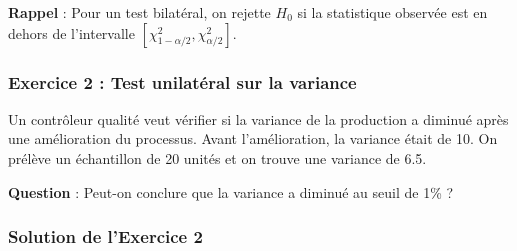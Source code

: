 \documentclass[11pt,a4paper]{article}
\newcommand{\chideux}{\chi^2}
\begin{document}
\begin{rappelbox}
\textbf{Rappel} : Pour un test bilatéral, on rejette $H_0$ si la statistique observée est en dehors de l'intervalle $[\chideux_{1-\alpha/2}, \chideux_{\alpha/2}]$.
\end{rappelbox}

\newpage

\subsubsection{Exercice 2 : Test unilatéral sur la variance}

Un contrôleur qualité veut vérifier si la variance de la production a diminué après une amélioration du processus. Avant l'amélioration, la variance était de 10. On prélève un échantillon de 20 unités et on trouve une variance de 6.5.

\textbf{Question} : Peut-on conclure que la variance a diminué au seuil de 1\% ?

\subsubsection*{Solution de l'Exercice 2}
\end{document}
